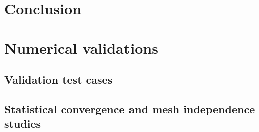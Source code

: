 \documentclass[12pt]{My_preprint}
\begin{document}



\section{Conclusion}


\appendix
\section{Numerical validations}
\label{ap:validation}
\subsection{Validation test cases}

\subsection{Statistical convergence and mesh independence studies}




\end{document}
